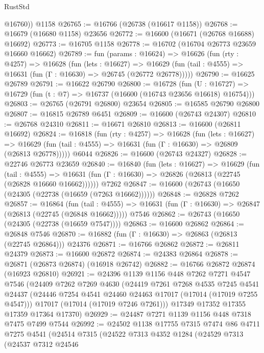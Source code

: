 \begin{lexlean}{RustStd}
\begin{coremodule}
{\begin{coremodule}
{{{{{{{{{{{{{{{{{{{{{{{{{{{{{{{{{{{{{{{{{{{{{{{{{{{{{{{        @16760))
    @1158
@26765 := @16766 (@26738 (@16617 @1158))
@26768 := @16679 (@16680 @1158) @23656
@26772 := @16600 (@16671 (@26768 @16688) @16692)
@26773 := @16705 @1158
@26778 := @16702 (@16704 @26773 @23659 @16660 @16662)
@26789 := fun (params : @16624) =>
  @16626
    (fun (rty : @4257) =>
    @16628
      (fun (lets : @16627) =>
      @16629 (fun (tail : @4555) => @16631 (fun (Γ : @16630) => @26745 (@26772 @26778)))))
@26790 := @16625 @26789
@26791 := @16622 @26790
@26800 := @16728
    (fun (U : @16727) => @16729 (fun (t : @7) => @16737 (@16600 (@16743 @23656 @16618) @16754)))
@26803 := @26765 (@26791 @26800) @23654
@26805 := @16585 @26790 @26800
@26807 := @16815 @26789 @6451
@26809 := @16600 (@26743 @24307)
@26810 := @26768 @24310
@26811 := @16671 @26810
@26813 := @16600 (@26811 @16692)
@26824 := @16818
    (fun (rty : @4257) =>
    @16628
      (fun (lets : @16627) =>
      @16629 (fun (tail : @4555) => @16631 (fun (Γ : @16630) => @26809 (@26813 @26778)))))
    @6044
@26826 := @16600 (@26743 @24327)
@26828 := @22746 @26773 @23659
@26840 := @16840
    (fun (lets : @16627) =>
    @16629
      (fun (tail : @4555) =>
      @16631 (fun (Γ : @16630) => @26826 (@26813 (@22745 (@26828 @16660 @16662))))))
    @7262
@26847 := @16600 (@26743 (@16650 (@24305 (@22738 (@16659 (@7263 @16662))))))
@26848 := @26828 @7262
@26857 := @16864
    (fun (tail : @4555) => @16631 (fun (Γ : @16630) => @26847 (@26813 (@22745 (@26848 @16662)))))
    @7546
@26862 := @26743 (@16650 (@24305 (@22738 (@16659 @7547))))
@26863 := @16600 @26862
@26864 := @26848 @7546
@26870 := @16882 (fun (Γ : @16630) => @26863 (@26813 (@22745 @26864))) @24376
@26871 := @16766 @26862
@26872 := @26811 @24379
@26873 := @16600 @26872
@26874 := @24383 @26864
@26878 := @26871 (@26873 @26874) (@16918 @26742)
@26882 := @16766 @26872 @26874 (@16923 @26810)
@26921 := @24396
    @1139
    @1156
    @448
    @7262
    @7271
    @4547
    @7546
    (@24409
      @7262
      @7269
      @4630
      (@24419
        @7261
        @7268
        @4535
        @7245
        @4541
        @24437
        (@24446 @7254 @4541 @24460 @24463 @17017 (@17014 (@17019 @7255 @4547)))
        @17017
        (@17014 (@17019 @7246 @7261)))
      @17349
      @17352
      @17355
      @17359
      @17364
      @17370)
@26929 := @24487 @7271 @1139 @1156 @448 @7318 @7475 @7499 @7544
@26992 := @24502
    @1138
    @17755
    @7315
    @7474
    @86
    @4711
    @7275
    @4541
    (@24514
      @7315
      (@24522
        @7313
        @4352
        @1284
        (@24529
          @7313
          (@24537
            @7312
            @24546
}}}}}}}}}}}}}}}}}}}}}}}}}}}}}}}}}}}}}}}}}}}}}}}}}}}}}}}
\end{coremodule}}
\end{coremodule}
\end{lexlean}

